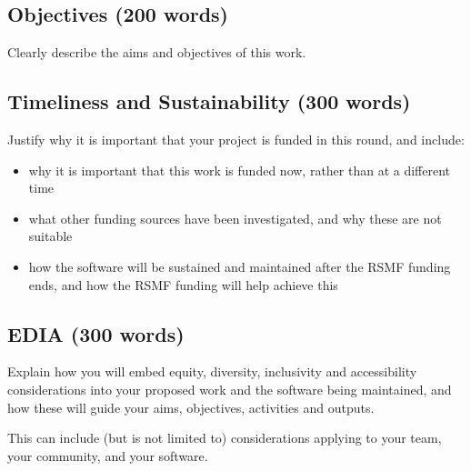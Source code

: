 \documentclass[12pt]{article}
\newenvironment{instruction}{%
    \begin{tcolorbox}[colback=red!5,colframe=red,title=Instruction]%
}{%
    \end{tcolorbox}%
}
\begin{document}


\subsection*{Objectives (200 words)}

\begin{instruction}

Clearly describe the aims and objectives of this work.

\end{instruction}

\subsection*{Timeliness and Sustainability (300 words)}

\begin{instruction}

Justify why it is important that your project is funded in this round, and include:

    \begin{itemize}
        \item why it is important that this work is funded now, rather than at a different time
        \item what other funding sources have been investigated, and why these are not suitable
        \item how the software will be sustained and maintained after the RSMF funding ends, and how the RSMF funding will help achieve this
    \end{itemize}

\end{instruction}

\subsection*{EDIA (300 words)}

\begin{instruction}
Explain how you will embed equity, diversity, inclusivity and accessibility considerations into your proposed work and the software being maintained, and how these will guide your aims, objectives, activities and outputs.

This can include (but is not limited to) considerations applying to your team, your community, and your software.
\end{instruction}

\pagebreak
\end{document}
